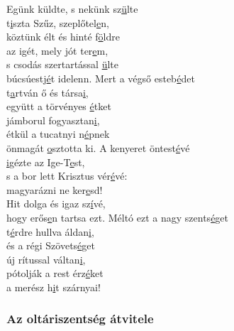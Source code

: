 \documentclass[twoside]{article}
\begin{document}
\begin{hymnstanzas}
  Egünk küldte, s nekünk sz\underline{ü}lte\\
  t\underline{i}szta Szűz, szeplőtel\underline{e}n,\\
  köztünk élt és hinté f\underline{ö}ldre\\
  az igét, mely jót ter\underline{e}m,\\
  s csodás szertartással \underline{ü}lte\\
  búcsúestj\underline{é}t idelenn.
\stanzabreak
  Mert a végső esteb\underline{é}det\\
  t\underline{a}rtván ő és társa\underline{i},\\
  együtt a törvényes \underline{é}tket\\
  jámborul fogyasztan\underline{i},\\
  étkül a tucatnyi n\underline{é}pnek\\
  önmagát \underline{o}sztotta ki.
\stanzabreak
  A kenyeret öntest\underline{é}vé\\
  \underline{i}gézte az Ige-T\underline{e}st,\\
  s a bor lett Krisztus vér\underline{é}vé:\\
  magyarázni ne ker\underline{e}sd!\\
  Hit dolga és igaz sz\underline{í}vé,\\
  hogy erős\underline{e}n tartsa ezt.
\stanzabreak
  Méltó ezt a nagy szents\underline{é}get\\
  t\underline{é}rdre hullva áldan\underline{i},\\
  és a régi Szövets\underline{é}get\\
  új rítussal váltan\underline{i},\\
  pótolják a rest érz\underline{é}ket\\
  a merész h\underline{i}t szárnyai!
\end{hymnstanzas}

\subsubsection*{Az oltáriszentség átvitele}
\end{document}
